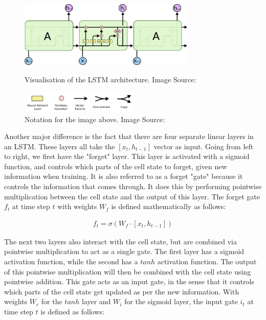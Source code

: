 \begin{figure}[h]
    \centering
        \includegraphics[width=0.75\textwidth]{latex/imgs/lstm.png}
    \caption{Visualisation of the LSTM architecture. Image Source:\cite{lstm}}
    \centering
        \includegraphics[width=0.5\textwidth]{latex/imgs/lstm_notation.png}
    \caption{Notation for the image above. Image Source:\cite{lstm}}
\end{figure}

\noindent
Another major difference is the fact that there are four separate linear layers in an LSTM. These layers all take the $[x_t,h_{t-1}]$ vector as input. Going from left to right, we first have the "forget" layer. This layer is activated with a sigmoid function, and controls which parts of the cell state to forget, given new information when training. It is also referred to as a forget "gate" because it controls the information that comes through. It does this by performing pointwise multiplication between the cell state and the output of this layer. The forget gate $f_t$ at time step $t$ with weights $W_f$ is defined mathematically as follows:

\begin{align}
    f_t = \sigma (W_f \cdot [x_t,h_{t-1}])
\end{align}

\noindent
The next two layers also interact with the cell state, but are combined via pointwise multiplication to act as a single gate. The first layer has a sigmoid activation function, while the second has a $tanh$ activation function. The output of this pointwise multiplication will then be combined with the cell state using pointwise addition. This gate acts as an input gate, in the sense that it controls which parts of the cell state get updated as per the new information. With weights $W_c$ for the $tanh$ layer and $W_i$ for the sigmoid layer, the input gate $i_t$ at time step $t$ is defined as follows:

